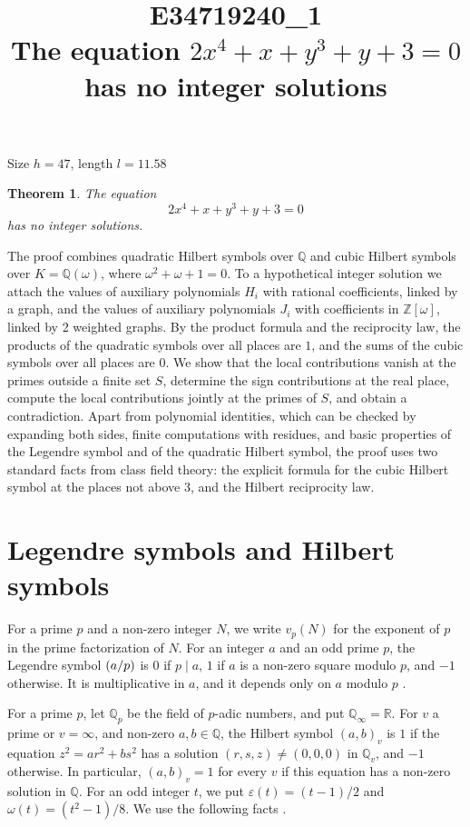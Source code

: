 \documentclass[11pt]{article}
\title{\textbf{E34719240\_1}\\[4pt] {\Large The equation $2x^{4}+x+y^{3}+y+3=0$ has no integer solutions}}
\author{}
\date{}
\newtheorem{theorem}{Theorem}
\newcommand{\Z}{\mathbb{Z}}
\newcommand{\Q}{\mathbb{Q}}
\newcommand{\leg}[2]{\mathchoice{\biggl(\dfrac{#1}{#2}\biggr)}{(#1/#2)}{(#1/#2)}{(#1/#2)}}
\begin{document}
\maketitle
\vspace{-8ex}
\begin{center}
Size $h=47$, length $l=11.58$
\end{center}

\begin{theorem}\label{thm:main}
The equation
\begin{equation}\label{eq:main}
2x^{4}+x+y^{3}+y+3=0
\end{equation}
has no integer solutions.
\end{theorem}

The proof combines quadratic Hilbert symbols over $\Q$ and cubic Hilbert symbols over $K=\Q(\omega)$, where $\omega^2+\omega+1=0$. To a hypothetical integer solution we attach the values of auxiliary polynomials $H_i$ with rational coefficients, linked by a graph, and the values of auxiliary polynomials $J_i$ with coefficients in $\Z[\omega]$, linked by 2 weighted graphs. By the product formula and the reciprocity law, the products of the quadratic symbols over all places are $1$, and the sums of the cubic symbols over all places are $0$. We show that the local contributions vanish at the primes outside a finite set $S$, determine the sign contributions at the real place, compute the local contributions jointly at the primes of $S$, and obtain a contradiction. Apart from polynomial identities, which can be checked by expanding both sides, finite computations with residues, and basic properties of the Legendre symbol and of the quadratic Hilbert symbol, the proof uses two standard facts from class field theory: the explicit formula for the cubic Hilbert symbol at the places not above $3$, and the Hilbert reciprocity law.

\section{Legendre symbols and Hilbert symbols}

For a prime $p$ and a non-zero integer $N$, we write $v_p(N)$ for the exponent of $p$ in the prime factorization of $N$. For an integer $a$ and an odd prime $p$, the Legendre symbol $\leg{a}{p}$ is $0$ if $p\mid a$, $1$ if $a$ is a non-zero square modulo $p$, and $-1$ otherwise. It is multiplicative in $a$, and it depends only on $a$ modulo $p$ \cite[Chapter~5]{IR}.

For a prime $p$, let $\Q_p$ be the field of $p$-adic numbers, and put $\Q_\infty=\mathbb R$. For $v$ a prime or $v=\infty$, and non-zero $a,b\in\Q$, the Hilbert symbol $(a,b)_v$ is $1$ if the equation $z^2=ar^2+bs^2$ has a solution $(r,s,z)\neq(0,0,0)$ in $\Q_v$, and $-1$ otherwise. In particular, $(a,b)_v=1$ for every $v$ if this equation has a non-zero solution in $\Q$. For an odd integer $t$, we put $\varepsilon(t)=(t-1)/2$ and $\omega(t)=(t^2-1)/8$. We use the following facts \cite[Chapter~III, Proposition~2 and Theorems~1 and~3]{Se}.
\end{document}
